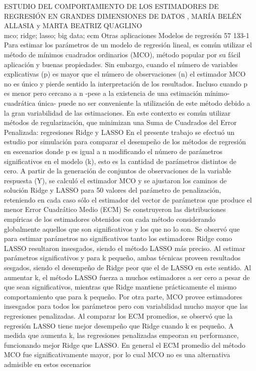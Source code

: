 \A
{ESTUDIO DEL COMPORTAMIENTO DE LOS ESTIMADORES DE REGRESIÓN EN GRANDES DIMENSIONES DE DATOS}
{, MARÍA BELÉN ALLASIA y MARTA BEATRIZ QUAGLINO}
{
\\}
{mco; ridge; lasso; big data; ecm} 
 {Otras aplicaciones} 
 {Modelos de regresión} 
 {57} 
 {133-1}
{Para estimar los parámetros de un modelo de regresión lineal, es común utilizar el método de mínimos cuadrados ordinarios (MCO), método popular por su fácil aplicación y buenas propiedades. Sin embargo, cuando el número de variables explicativas (p) es mayor que el número de observaciones (n) el estimador MCO no es único y pierde sentido la interpretación de los resultados. Incluso cuando p es menor pero cercano a n -pese a la existencia de una estimación mínimo-cuadrática única- puede no ser conveniente la utilización de este método debido a la gran variabilidad de las estimaciones. En este contexto es común utilizar métodos de regularización, que minimizan una Suma de Cuadrados del Error Penalizada: regresiones Ridge y LASSO En el presente trabajo se efectuó un estudio por simulación para comparar el desempeño de los métodos de regresión en escenarios donde p es igual a n modificando el número de parámetros significativos en el modelo (k), esto es la cantidad de parámetros distintos de cero. A partir de la generación de conjuntos de observaciones de la variable respuesta (Y), se calculó el estimador MCO y se ajustaron los caminos de solución Ridge y LASSO para 50 valores del parámetro de penalización, reteniendo en cada caso sólo el estimador del vector de parámetros que produce el menor Error Cuadrático Medio (ECM) Se construyeron las distribuciones empíricas de los estimadores obtenidos con cada método considerando globalmente aquellos que son significativos y los que no lo son. Se observó que para estimar parámetros no significativos tanto los estimadores Ridge como LASSO resultaron insesgados, siendo el método LASSO más preciso. Al estimar parámetros significativos y para k pequeño, ambas técnicas proveen resultados sesgados, siendo el desempeño de Ridge peor que el de LASSO en este sentido. Al aumentar k, el método LASSO fuerza a muchos estimadores a ser cero a pesar de que sean significativos, mientras que Ridge mantiene prácticamente el mismo comportamiento que para k pequeño. Por otra parte, MCO provee estimadores insesgados para todos los parámetros pero con variabilidad mucho mayor que las regresiones penalizadas. Al comparar los ECM promedios, se observó que la regresión LASSO tiene mejor desempeño que Ridge cuando k es pequeño. A medida que aumenta k, las regresiones penalizadas empeoran su performance, funcionando mejor Ridge que LASSO. En general el ECM promedio del método MCO fue significativamente mayor, por lo cual MCO no es una alternativa admisible en estos escenarios}

